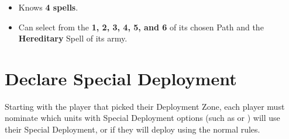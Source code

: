 \subsubsection{\wizardmaster}

\begin{itemize}[label={-}]
\item Knows \textbf{4 spells}.
\item Can select from the \learnedspells{} \textbf{1, 2, 3, 4, 5, and 6} of its chosen Path and the \textbf{Hereditary} Spell of its army.
\end{itemize}

\section{Declare Special Deployment}
\label{declare_special_deployment}

Starting with the player that picked their Deployment Zone, each player must nominate which units with Special Deployment options (such as \hyperref[scout]{\scout{}} or \hyperref[ambush]{\ambush{}}) will use their Special Deployment, or if they will deploy using the normal rules.